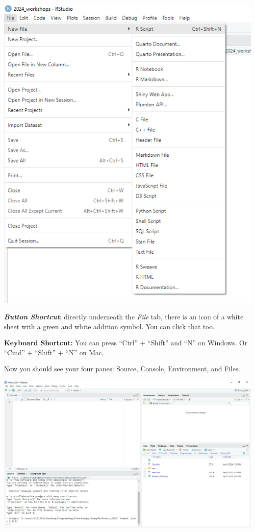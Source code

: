 \documentclass[
]{book}
\begin{document}
\includegraphics{img/rstudio_create_file.png}

\textbf{\emph{Button Shortcut}}: directly underneath the \emph{File} tab, there is an icon of a white sheet with a green and white addition symbol. You can click that too.

\textbf{Keyboard Shortcut:} You can press ``Ctrl'' + ``Shift'' and ``N'' on Windows. Or ``Cmd'' + ``Shift'' + ``N'' on Mac.

Now you should see your four panes: Source, Console, Environment, and Files.

\includegraphics{img/01-four-panes.png}
\end{document}
